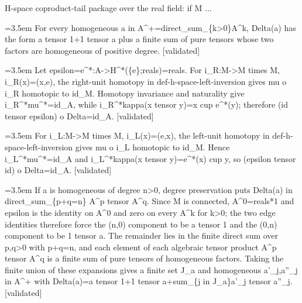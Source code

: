 \documentclass{article}
\newcommand{\step}[1]{\par\noindent\hangindent=3.5em\hangafter=1%
  \makebox[3.5em][l]{\textbf{#1.}}}
\newcommand{\steptag}[1]{\hfill{\small\textsf{[#1]}}}
\begin{document}
\begin{proofbox}{H-space coproduct-tail package over the real field: if M ...}
\step{1.4} For every homogeneous a in A\textasciicircum{}+=direct\_sum\_\{k>0\}A\textasciicircum{}k, Delta(a) has the form a tensor 1+1 tensor a plus a finite sum of pure tensors whose two factors are homogeneous of positive degree. \steptag{validated} \\[6pt]
\step{1.4.1} Let epsilon=e\textasciicircum{}*:A->H\textasciicircum{}*(\{e\};reals)=reals. For i\_R:M->M times M, i\_R(x)=(x,e), the right-unit homotopy in def-h-space-left-inversion gives mu o i\_R homotopic to id\_M. Homotopy invariance and naturality give i\_R\textasciicircum{}*mu\textasciicircum{}*=id\_A, while i\_R\textasciicircum{}*kappa(x tensor y)=x cup e\textasciicircum{}*(y); therefore (id tensor epsilon) o Delta=id\_A. \steptag{validated} \\[4pt]
\step{1.4.2} For i\_L:M->M times M, i\_L(x)=(e,x), the left-unit homotopy in def-h-space-left-inversion gives mu o i\_L homotopic to id\_M. Hence i\_L\textasciicircum{}*mu\textasciicircum{}*=id\_A and i\_L\textasciicircum{}*kappa(x tensor y)=e\textasciicircum{}*(x) cup y, so (epsilon tensor id) o Delta=id\_A. \steptag{validated} \\[4pt]
\step{1.4.3} If a is homogeneous of degree n>0, degree preservation puts Delta(a) in direct\_sum\_\{p+q=n\} A\textasciicircum{}p tensor A\textasciicircum{}q. Since M is connected, A\textasciicircum{}0=reals*1 and epsilon is the identity on A\textasciicircum{}0 and zero on every A\textasciicircum{}k for k>0; the two edge identities therefore force the (n,0) component to be a tensor 1 and the (0,n) component to be 1 tensor a. The remainder lies in the finite direct sum over p,q>0 with p+q=n, and each element of each algebraic tensor product A\textasciicircum{}p tensor A\textasciicircum{}q is a finite sum of pure tensors of homogeneous factors. Taking the finite union of these expansions gives a finite set J\_a and homogeneous a'\_j,a''\_j in A\textasciicircum{}+ with Delta(a)=a tensor 1+1 tensor a+sum\_\{j in J\_a\}a'\_j tensor a''\_j. \steptag{validated} \\[4pt]
\end{proofbox}
\end{document}
